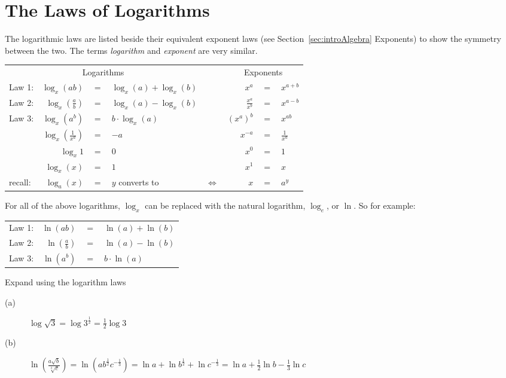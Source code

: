 \section{The Laws of Logarithms}

The logarithmic laws are listed beside their equivalent exponent laws (see Section~\ref{sec:introAlgebra} Exponents) to show the symmetry between the two. The terms \textit{logarithm} and \textit{exponent} are very similar.
\begin{tcolorbox}
\begin{center}
\renewcommand{\arraystretch}{1.2}
\begin{tabular}{lrclcrcl}
	\multicolumn{4}{c}{Logarithms}& &\multicolumn{3}{c}{Exponents}\\
	\cmidrule{1-4}\cmidrule{6-8}
	Law 1: &$ \log_x(ab) $&$=$&$ \log_x(a)+\log_x(b)  $&\hspace{1cm} &$x^a$&$=$&$x^{a+b} $\\
	Law 2: &$ \log_x\left(\frac{a}{b}\right) $&$=$&$  \log_x(a)-\log_x(b) $& &$\frac{x^a}{x^b}$&$=$&$x^{a-b}  $\\
	Law 3: &$ \log_x(a^b) $&$=$&$ b\cdot\log_x(a)   $& &$(x^a)^b $&$=$&$x^{ab} $\\
	\cmidrule{1-4}\cmidrule{6-8}
	&$  \log_{x}\left(\frac{1}{x^a}\right) $&$=$&$-a   $& &$x^{-a} $&$=$&$\frac{1}{x^a} $\\
	&$ \log_{x}1  $&$=$&$ 0  $& &$x^0 $&$=$&$1 $\\
	&$ \log_x(x) $&$=$&$  1 $& &$x^1 $&$=$&$x $\\
	\bottomrule
	recall:&$ \log_a(x) $&$=$&$y$\hspace{0.5cm} converts to& $\Leftrightarrow$ &$x $&$=$&$a^y $\\
	\bottomrule
\end{tabular}
\end{center}
For all of the above logarithms, $\log_x$ can be replaced with the natural logarithm, $\log_e$,  or $\ln$. So for example:
\begin{center}
	\renewcommand{\arraystretch}{1.2}
	\begin{tabular}{lrcl}
		Law 1: &$ \ln(ab) $&$=$&$ \ln(a)+\ln(b)  $\\
		Law 2: &$ \ln\left(\frac{a}{b}\right) $&$=$&$  \ln(a)-\ln(b) $\\
		Law 3: &$ \ln(a^b) $&$=$&$ b\cdot\ln(a)$ \\
	\end{tabular}
\end{center}
\end{tcolorbox}
\example
Expand using the logarithm laws 
\begin{description}
	\item [(a)] $\log  \sqrt{3} =\log  3^{\frac{1}{2}} =\frac{1}{2} \log  3$ 
	
	\item [(b)] $\ln  \genfrac{(}{)}{}{}{a \sqrt{b}}{\sqrt[{3}]{c}} =\ln  \left (a b^{\frac{1}{2}} c^{ -\frac{1}{3}}\right ) =\ln  a +\ln  b^{\frac{1}{2}} +\ln  c^{ -\frac{1}{3}} =\ln  a +\frac{1}{2} \ln  b -\frac{1}{3} \ln  c$ \end{description}

